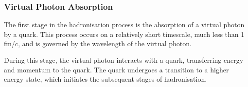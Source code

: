 \subsubsection{Virtual Photon Absorption}
\label{10.31::virtual_photon_absorption}
    The first stage in the hadronisation process is the absorption of a virtual photon by a quark.
    This process occurs on a relatively short timescale, much less than 1 fm/c, and is governed by the wavelength of the virtual photon.

    During this stage, the virtual photon interacts with a quark, transferring energy and momentum to the quark.
    The quark undergoes a transition to a higher energy state, which initiates the subsequent stages of hadronisation.
